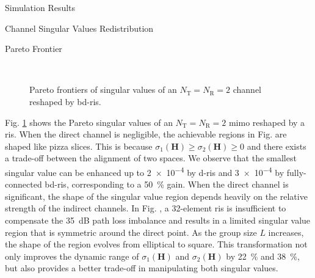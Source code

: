 \documentclass[journal]{IEEEtran}
\begin{document}
\begin{section}{Simulation Results}
	\begin{subsection}{Channel Singular Values Redistribution}
		\begin{subsubsection}{Pareto Frontier}
			\begin{figure}[!t]
				\centering
				\\
				\caption{Pareto frontiers of singular values of an $N_\mathrm{T}=N_\mathrm{R}=2$ channel reshaped by \gls{bd}-\gls{ris}.}
				\label{fg:singular_pareto}
			\end{figure}
			Fig. \ref{fg:singular_pareto} shows the Pareto singular values of an $N_\mathrm{T}=N_\mathrm{R}=2$ \gls{mimo} reshaped by a \gls{ris}.
			When the direct channel is negligible, the achievable regions in Fig.  are shaped like pizza slices.
			This is because $\sigma_1(\mathbf{H}) \ge \sigma_2(\mathbf{H}) \ge 0$ and there exists a trade-off between the alignment of two spaces.
			We observe that the smallest singular value can be enhanced up to \num{2e-4} by \gls{d}-\gls{ris} and \num{3e-4} by fully-connected \gls{bd}-\gls{ris}, corresponding to a \qty{50}{\percent} gain.
			When the direct channel is significant, the shape of the singular value region depends heavily on the relative strength of the indirect channels.
			In Fig. , a 32-element \gls{ris} is insufficient to compensate the \qty{35}{dB} path loss imbalance and results in a limited singular value region that is symmetric around the direct point.
			As the group size $L$ increases, the shape of the region evolves from elliptical to square.
			This transformation not only improves the dynamic range of $\sigma_1(\mathbf{H})$ and $\sigma_2(\mathbf{H})$ by \qty{22}{\percent} and \qty{38}{\percent}, but also provides a better trade-off in manipulating both singular values.

\end{subsubsection}
\end{subsection}
\end{section}
\end{document}

